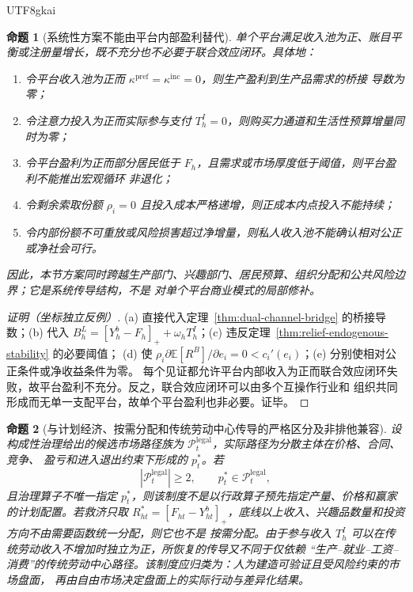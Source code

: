 \documentclass[12pt,a4paper,openany]{report}
\newtheorem{proposition}{命题}[chapter]
\newcommand{\EE}{\mathbb E}
\begin{document}
\begin{CJK*}{UTF8}{gkai}
\begin{proposition}[系统性方案不能由平台内部盈利替代]
\label{prop:platform-profit-not-strategic-closure}
单个平台满足收入池为正、账目平衡或注册量增长，既不充分也不必要于联合效应闭环。具体地：
\begin{enumerate}[label=\textup{(\alph*)},leftmargin=3em]
  \item 令平台收入池为正而 \(\kappa^{\mathrm{pref}}=\kappa^{\mathrm{inc}}=0\)，则生产盈利到生产品需求的桥接
  导数为零；
  \item 令注意力投入为正而实际参与支付 \(T_h^I=0\)，则购买力通道和生活性预算增量同时为零；
  \item 令平台盈利为正而部分居民低于 \(F_h\)，且需求或市场厚度低于阈值，则平台盈利不能推出宏观循环
  非退化；
  \item 令剩余索取份额 \(\rho_i=0\) 且投入成本严格递增，则正成本内点投入不能持续；
  \item 令内部份额不可重放或风险损害超过净增量，则私人收入池不能确认相对公正或净社会可行。
\end{enumerate}
因此，本节方案同时跨越生产部门、兴趣部门、居民预算、组织分配和公共风险边界；它是系统传导结构，不是
对单个平台商业模式的局部修补。
\end{proposition}

\begin{proof}[证明（坐标独立反例）]
(a) 直接代入定理~\ref{thm:dual-channel-bridge} 的桥接导数；(b) 代入
\(B_h^L=[Y_h^b-F_h]_++\omega_hT_h^I\)；(c) 违反定理~\ref{thm:relief-endogenous-stability} 的必要阈值；
(d) 使 \(\rho_i\partial\EE[R^B]/\partial e_i=0<c_i'(e_i)\)；(e) 分别使相对公正条件或净收益条件为零。
每个见证都允许平台内部收入为正而联合效应闭环失败，故平台盈利不充分。反之，联合效应闭环可以由多个互操作行业和
组织共同形成而无单一支配平台，故单个平台盈利也非必要。证毕。
\end{proof}

\begin{proposition}[与计划经济、按需分配和传统劳动中心传导的严格区分及非排他兼容]
\label{prop:strategic-system-classification}
设构成性治理给出的候选市场路径族为 \(\mathcal P_t^{\mathrm{legal}}\)，实际路径为分散主体在价格、合同、竞争、
盈亏和进入退出约束下形成的 \(p_t^*\)。若
\[
  |\mathcal P_t^{\mathrm{legal}}|\ge2,
  \qquad
  p_t^*\in\mathcal P_t^{\mathrm{legal}},
\]
且治理算子不唯一指定 \(p_t^*\)，则该制度不是以行政算子预先指定产量、价格和赢家的计划配置。若救济只取
\(R_{ht}^*=[F_{ht}-Y_{ht}^{b}]_+\)，底线以上收入、兴趣品数量和投资方向不由需要函数统一分配，则它也不是
按需分配。由于参与收入 \(T_h^I\) 可以在传统劳动收入不增加时独立为正，所恢复的传导又不同于仅依赖
“生产--就业--工资--消费”的传统劳动中心路径。该制度应归类为：人为建造可验证且受风险约束的市场盘面，
再由自由市场决定盘面上的实际行动与差异化结果。


\end{proposition}
\end{CJK*}
\end{document}
